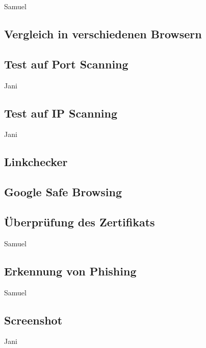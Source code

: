 \todo Samuel

\subsection{Vergleich in verschiedenen Browsern}


\subsection{Test auf Port Scanning}

\todo Jani

\subsection{Test auf IP Scanning}

\todo Jani

\subsection{Linkchecker}


\subsection{Google Safe Browsing}


\subsection{Überprüfung des Zertifikats}

\todo Samuel

\subsection{Erkennung von Phishing}

\todo Samuel

\subsection{Screenshot}

\todo Jani
